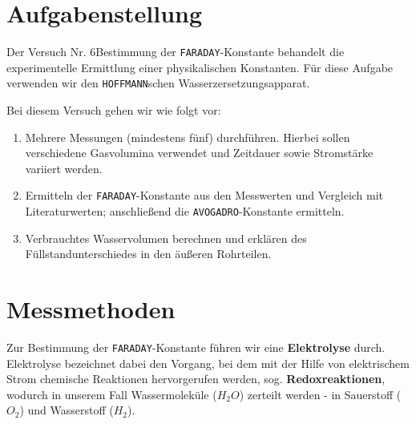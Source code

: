 \documentclass[10pt,a4paper]{article}
\newcommand{\vnr}{6}
\begin{document}
\newpage

\tableofcontents

\vspace{10pt}

\section{Aufgabenstellung}
\begin{flushleft}
Der Versuch Nr. \vnr \glqq Bestimmung der \texttt{FARADAY}-Konstante\grqq\hspace{1pt} behandelt die experimentelle Ermittlung einer physikalischen Konstanten. Für diese Aufgabe verwenden wir den \texttt{HOFFMANN}schen Wasserzersetzungsapparat.

Bei diesem Versuch gehen wir wie folgt vor:
\begin{enumerate}[label=\Roman*), itemsep=0pt]
\item Mehrere Messungen (mindestens fünf) durchführen. Hierbei sollen verschiedene Gasvolumina verwendet und Zeitdauer sowie Stromstärke variiert werden.
\item Ermitteln der \texttt{FARADAY}-Konstante aus den Messwerten und Vergleich mit Literaturwerten; anschließend die \texttt{AVOGADRO}-Konstante ermitteln.
\item Verbrauchtes Wasservolumen berechnen und erklären des Füllstandunterschiedes in den äußeren Rohrteilen.
\end{enumerate}
\end{flushleft}


\section{Messmethoden}
\begin{flushleft}
Zur Bestimmung der \texttt{FARADAY}-Konstante führen wir eine \textbf{Elektrolyse} durch. Elektrolyse bezeichnet dabei den Vorgang, bei dem mit der Hilfe von elektrischem Strom chemische Reaktionen hervorgerufen werden, sog. \textbf{Redoxreaktionen}, wodurch in unserem Fall Wassermoleküle ($H_2O$) zerteilt werden - in Sauerstoff ($O_2$) und Wasserstoff ($H_2$).
\end{flushleft}
\end{document}
